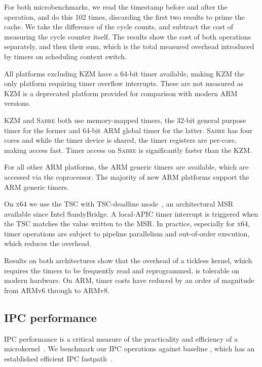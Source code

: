 For both microbenchmarks, we read the timestamp before and after the operation, and do this 102
times, discarding the first two results to prime the cache.  We take the difference of the cycle
counts, and subtract the cost of measuring the cycle counter itself. The results show the cost of
both operations separately, and then their sum, which is the total measured overhead introduced by timers on
scheduling context switch.

All platforms excluding \textsc{KZM} have a 64-bit timer available, making \textsc{KZM} the only
platform requiring timer overflow interrupts. These are not measured as \textsc{KZM} is a deprecated
platform provided for comparison with modern ARM versions.

\textsc{KZM} and \textsc{Sabre} both use memory-mapped timers, the 32-bit general purpose timer for
the former and 64-bit ARM global timer for the latter. \textsc{Sabre} has four cores and while the
timer device is shared, the timer registers are per-core, making access fast. 
Timer access on \textsc{Sabre} is significantly faster than the \textsc{KZM}. 

For all other ARM platforms, the ARM generic timers are available, which are accessed via the
coprocessor. The majority of new ARM platforms support the ARM generic timers. 

On \textsc{x64} we use the \gls{TSC} with \gls{TSC}-deadline
mode~\citep{Intel_64_IA-32:asdmspg_325384}, an architectural \gls{MSR} available since
Intel SandyBridge. A local-APIC timer interrupt is triggered when the \gls{TSC} matches the
value written to the \gls{MSR}. 
In practice, especially
for \textsc{x64}, timer operations are subject to pipeline parallelism and out-of-order execution, which
reduces the overhead.

Results on both architectures show that the overhead of a tickless kernel, which requires the timers
to be frequently read and reprogrammed, is tolerable on modern hardware. On ARM, timer costs have
reduced by an order of magnitude from ARMv6 through to ARMv8. 
\clearpage
\subsection{IPC performance}

\Gls{IPC} performance is a critical measure of the practicality and efficiency of a
microkernel~\citep{Liedtke_95}. We benchmark our \gls{IPC} operations against baseline \selfour,
which has an established efficient \gls{IPC} fastpath~\citep{Elphinstone_Heiser_13}. 

